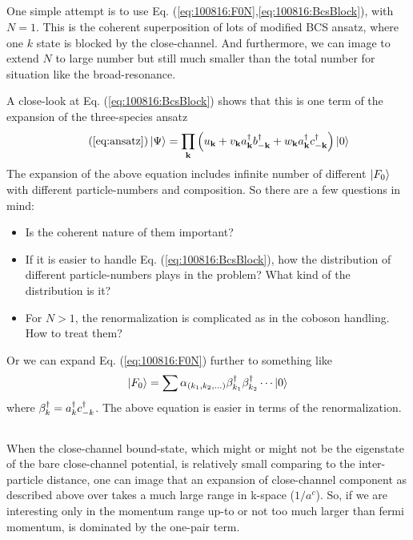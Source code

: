 \subsection{}
One simple attempt is to use Eq. (\ref{eq:100816:F0N},\ref{eq:100816:BcsBlock}),  with $N=1$.  This is the coherent superposition of lots of modified BCS ansatz, where one $k$ state is blocked by the close-channel.  And furthermore, we can image to extend $N$ to large number but still much smaller than the total number for situation like the broad-resonance.  

A close-look at Eq. (\ref{eq:100816:BcsBlock}) shows that this is one term of the expansion of the three-species ansatz
\begin{equation}\tag{\ref{eq:ansatz}}
 \ket{\Psi}=\prod_\vk\br{u_\vk+v_\vk{}a^\dg_\vk{}b^\dg_{-\vk}+w_\vk{}a^\dg_\vk{}c^\dg_{-\vk}}\ket{0}
\end{equation}
The expansion of the above equation includes infinite number of different $\left|F_{0}\right>$ with different particle-numbers and composition.  So there are a few questions in mind:

\begin{itemize}
\item Is the coherent nature of them important?
\item If it is easier to handle Eq. (\ref{eq:100816:BcsBlock}), how the distribution of different particle-numbers plays in the problem?  What kind of the distribution is it? 
\item For $N>1$, the renormalization is complicated as in the coboson handling.  How to treat them? 
\end{itemize}

Or we can expand Eq. (\ref{eq:100816:F0N}) further to something like 
\begin{equation}\label{eq:100823:F0N}
\left|F_{0}\right>=\sum\alpha_{(k_1,k_{2},...)}\beta^{\dagger}_{k_{1}}\beta^{\dagger}_{k_{2}}\cdots\left|0\right>
\end{equation}
where $\beta^{\dagger}_{k}=a^{\dagger}_{k}c^{\dagger}_{-k}$.
The above equation is easier in terms of the renormalization.  

\subsection{}
When the close-channel bound-state, which might or might not be the eigenstate of the bare close-channel potential, is relatively small comparing to the inter-particle distance, one can image that an expansion of close-channel component as described above over  takes a much large range in k-space ($1/a^{c}$).   So, if we are interesting only in the momentum range up-to or not too much larger than fermi momentum,  is dominated by the one-pair term.  